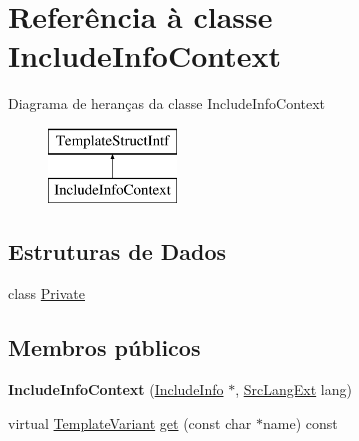 \hypertarget{class_include_info_context}{\section{Referência à classe Include\-Info\-Context}
\label{class_include_info_context}
}
Diagrama de heranças da classe Include\-Info\-Context\begin{figure}[H]
\begin{center}
\leavevmode
\includegraphics[height=2.000000cm]{class_include_info_context}
\end{center}
\end{figure}
\subsection*{Estruturas de Dados}
\begin{DoxyCompactItemize}
\item 
class \hyperlink{class_include_info_context_1_1_private}{Private}
\end{DoxyCompactItemize}
\subsection*{Membros públicos}
\begin{DoxyCompactItemize}
\item 
\hypertarget{class_include_info_context_a0455262e686cebbb4a4112826274da5b}{{\bfseries Include\-Info\-Context} (\hyperlink{struct_include_info}{Include\-Info} $\ast$, \hyperlink{types_8h_a9974623ce72fc23df5d64426b9178bf2}{Src\-Lang\-Ext} lang)}\label{class_include_info_context_a0455262e686cebbb4a4112826274da5b}

\item 
virtual \hyperlink{class_template_variant}{Template\-Variant} \hyperlink{class_include_info_context_a1bcfea01201f3ea09981a8442842c42d}{get} (const char $\ast$name) const 
\end{DoxyCompactItemize}


